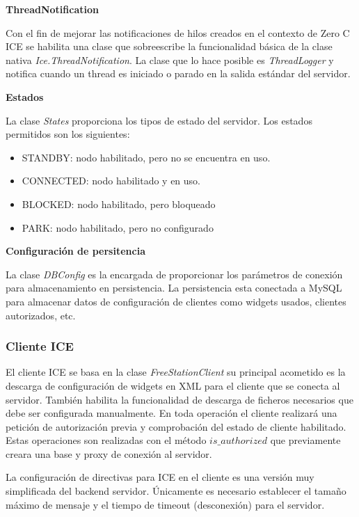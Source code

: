 \newpage

\textbf{ThreadNotification}

Con el fin de mejorar las notificaciones de hilos creados en el contexto de
Zero C ICE se habilita una clase que sobreescribe la funcionalidad básica de la
clase nativa \emph{Ice.ThreadNotification}. La clase que lo hace posible es
\emph{ThreadLogger} y notifica cuando un thread es iniciado o parado en la
salida estándar del servidor.

\textbf{Estados}

La clase \emph{States} proporciona los tipos de estado del servidor. Los estados
permitidos son los siguientes:

\begin{itemize}
  \item STANDBY: nodo habilitado, pero no se encuentra en uso.
  \item CONNECTED: nodo habilitado y en uso.
  \item BLOCKED: nodo habilitado, pero bloqueado
  \item PARK: nodo habilitado, pero no configurado
\end{itemize}

\textbf{Configuración de persitencia}

La clase \emph{DBConfig} es la encargada de proporcionar los parámetros de
conexión para almacenamiento en persistencia. La persistencia esta conectada a
MySQL para almacenar datos de configuración de clientes como widgets usados,
clientes autorizados, etc.

\subsubsection{Cliente ICE}

El cliente ICE se basa en la clase \emph{FreeStationClient} su principal
acometido es la descarga de configuración de widgets en XML para el cliente que
se conecta al servidor. También habilita la funcionalidad de descarga de
ficheros necesarios que debe ser configurada manualmente. En toda operación el 
cliente realizará una petición de autorización previa y comprobación del estado
de cliente habilitado. Estas operaciones son realizadas con el método
$is\_authorized$ que previamente creara una base y proxy de conexión al
servidor. 

\newpage

La configuración de directivas para ICE en el cliente es una versión
muy simplificada del backend servidor. Únicamente es necesario establecer el
tamaño máximo de mensaje y el tiempo de timeout (desconexión) para el servidor.

